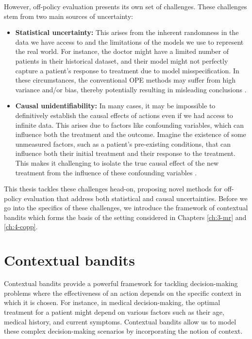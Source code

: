 However, off-policy evaluation presents its own set of challenges. These challenges stem from two main sources of uncertainty:

\begin{itemize}
    \item \textbf{Statistical uncertainty:} This arises from the inherent randomness in the data we have access to and the limitations of the models we use to represent the real world. 
    For instance, the doctor might have a limited number of patients in their historical dataset, and their model might not perfectly capture a patient's response to treatment due to model misspecification.
    In these circumstances, the conventional OPE methods may suffer from high variance and/or bias, thereby potentially resulting in misleading conclusions \citep{saito2021evaluating,su2020doubly,saito2022off}. 
    \item \textbf{Causal unidentifiability:} In many cases, it may be impossible to definitively establish the causal effects of actions even if we had access to infinite data. This arises due to factors like confounding variables, which can influence both the treatment and the outcome. Imagine the existence of some unmeasured factors, such as a patient's pre-existing conditions, that can influence both their initial treatment and their response to the treatment. This makes it challenging to isolate the true causal effect of the new treatment from the influence of these confounding variables \citep{tsiatis2019dynamic,kallus2018confounding,namkoong2020offpolicy}.
\end{itemize}
This thesis tackles these challenges head-on, proposing novel methods for off-policy evaluation that address both statistical and causal uncertainties.
Before we go into the specifics of these challenges, we introduce the framework of contextual bandits which forms the basis of the setting considered in Chapters \ref{ch:3-mr} and \ref{ch:4-copp}. 


\section{Contextual bandits}
Contextual bandits \citep{Lattimore_Szepesvári_2020} provide a powerful framework for tackling decision-making problems where the effectiveness of an action depends on the specific context in which it is chosen. 
For instance, in medical decision-making, the optimal treatment for a patient might depend on various factors such as their age, medical history, and current symptoms. 
Contextual bandits allow us to model these complex decision-making scenarios by incorporating the notion of context.

